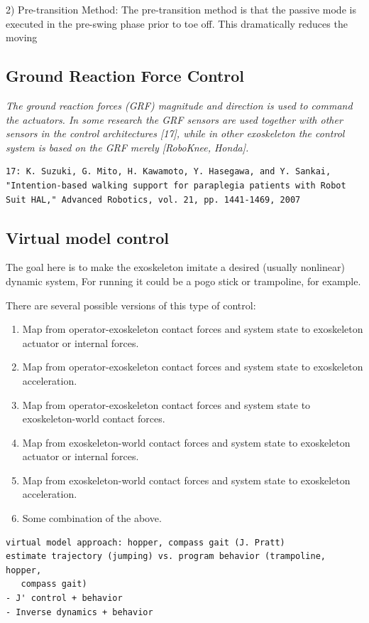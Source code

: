 \documentclass[letterpaper,12pt,fullpage]{article}
\begin{document}
2) Pre-transition Method: The pre-transition method is
that the passive mode is executed in the pre-swing phase
prior to toe off. This dramatically reduces the moving

\subsection{Ground Reaction Force Control}

{\it
The ground reaction
forces (GRF) magnitude and direction is used to command the
actuators. In some research the GRF sensors are used
together with other sensors in the control architectures [17],
while in other exoskeleton the control system is based on the
GRF merely [RoboKnee, Honda].
}
\begin{verbatim}
17: K. Suzuki, G. Mito, H. Kawamoto, Y. Hasegawa, and Y. Sankai,
"Intention-based walking support for paraplegia patients with Robot
Suit HAL," Advanced Robotics, vol. 21, pp. 1441-1469, 2007
\end{verbatim}

\subsection{Virtual model control}

The goal here is to make the exoskeleton imitate a desired (usually nonlinear)
dynamic system,
For running it could be a pogo stick or trampoline, for example.

There are several possible versions of this type of control:
\begin{enumerate}
\item
Map from operator-exoskeleton contact forces and system state
to exoskeleton actuator or internal forces.
\item
Map from operator-exoskeleton contact forces and system state
to exoskeleton acceleration.
\item
Map from operator-exoskeleton contact forces and system state
to exoskeleton-world contact forces.
\item
Map from exoskeleton-world contact forces and system state to exoskeleton actuator or internal forces.
\item
Map from exoskeleton-world contact forces and system state to exoskeleton acceleration.
\item
Some combination of the above.
\end{enumerate}

\begin{verbatim}
virtual model approach: hopper, compass gait (J. Pratt)
estimate trajectory (jumping) vs. program behavior (trampoline, hopper,
   compass gait)
- J' control + behavior
- Inverse dynamics + behavior
\end{verbatim}
\end{document}
